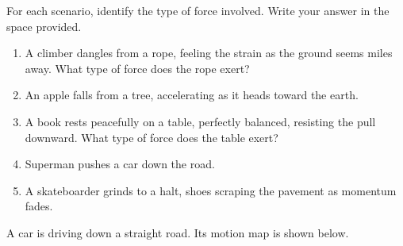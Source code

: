 \documentclass[answers]{exam}
\begin{document}
\begin{questions}
\clearpage
\question[5]
For each scenario, identify the type of force involved. Write your answer in the space provided.

\begin{enumerate} %
    \item A climber dangles from a rope, feeling the strain as the ground seems miles away. What type of force does the rope exert? \\[1ex]
    \item An apple falls from a tree, accelerating as it heads toward the earth. \\[1ex]
    \fillin[gravity][5cm]
    \item A book rests peacefully on a table, perfectly balanced, resisting the pull downward. What type of force does the table exert? \\[1ex]
    \item Superman pushes a car down the road. \\[1ex]
    \item A skateboarder grinds to a halt, shoes scraping the pavement as momentum fades.\\[1ex]
\end{enumerate}




\question
A car is driving down a straight road. Its motion map is shown below.


\end{questions}
\end{document}
